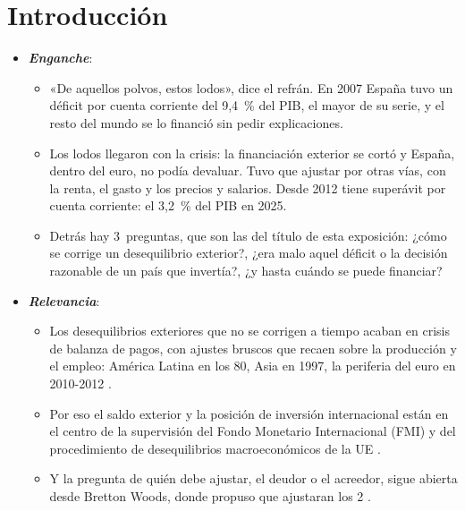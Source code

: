 \documentclass[11pt]{article}
\begin{document}
\tceetitulo

\section*{Introducción}

\begin{itemize}
\item \textbf{\emph{Enganche}}:
  \begin{itemize}
  \item «De aquellos polvos, estos lodos», dice el refrán. En 2007 España tuvo un déficit por cuenta corriente del 9,4~\% del PIB, el mayor de su serie, y el resto del mundo se lo financió sin pedir explicaciones\nocite{BdE2026BE17,Eurostat2026tipsbp11}.
  \item Los lodos llegaron con la crisis: la financiación exterior se cortó y España, dentro del euro, no podía devaluar. Tuvo que ajustar por otras vías, con la renta, el gasto y los precios y salarios. Desde 2012 tiene superávit por cuenta corriente: el 3,2~\% del PIB en 2025\nocite{BdE2026BE17}.
  \item Detrás hay 3~preguntas, que son las del título de esta exposición: ¿cómo se corrige un desequilibrio exterior?, ¿era malo aquel déficit o la decisión razonable de un país que invertía?, ¿y hasta cuándo se puede financiar?
  \end{itemize}

\item \textbf{\emph{Relevancia}}:
  \begin{itemize}
  \item Los desequilibrios exteriores que no se corrigen a tiempo acaban en crisis de balanza de pagos, con ajustes bruscos que recaen sobre la producción y el empleo: América Latina en los 80, Asia en 1997, la periferia del euro en 2010-2012\nocite{CataoMilesiFerretti2014} .
  \item Por eso el saldo exterior y la posición de inversión internacional están en el centro de la supervisión del Fondo Monetario Internacional (FMI)  y del procedimiento de desequilibrios macroeconómicos de la UE .
  \item Y la pregunta de quién debe ajustar, el deudor o el acreedor, sigue abierta desde Bretton Woods, donde  propuso que ajustaran los 2\nocite{Keynes1943Proposals} .
  \end{itemize}


\end{itemize}
\end{document}
